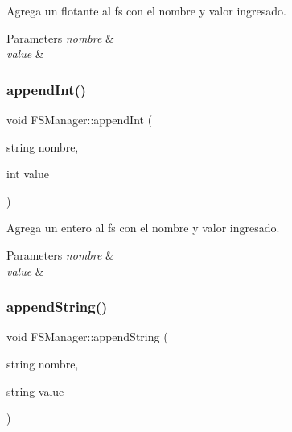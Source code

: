 Agrega un flotante al fs con el nombre y valor ingresado. 


\begin{DoxyParams}{Parameters}
{\em nombre} & \\
\hline
{\em value} & \\
\hline
\end{DoxyParams}
\mbox{\label{classFSManager_a3e4672be75f6edf00336adf883571963}} 
\subsubsection{\texorpdfstring{append\+Int()}{appendInt()}}
{\footnotesize\ttfamily void F\+S\+Manager\+::append\+Int (\begin{DoxyParamCaption}\item[{string}]{nombre,  }\item[{int}]{value }\end{DoxyParamCaption})\hspace{0.3cm}{\ttfamily [inline]}}



Agrega un entero al fs con el nombre y valor ingresado. 


\begin{DoxyParams}{Parameters}
{\em nombre} & \\
\hline
{\em value} & \\
\hline
\end{DoxyParams}
\mbox{\label{classFSManager_a74dc93c38eb23abda9dd5651bf696c17}} 
\subsubsection{\texorpdfstring{append\+String()}{appendString()}}
{\footnotesize\ttfamily void F\+S\+Manager\+::append\+String (\begin{DoxyParamCaption}\item[{string}]{nombre,  }\item[{string}]{value }\end{DoxyParamCaption})\hspace{0.3cm}{\ttfamily [inline]}}



